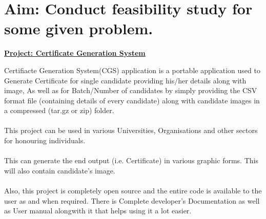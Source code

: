 \section*{\fontsize{16}{14}\selectfont Aim: Conduct feasibility study for some given problem.}
\begin{center}\underline{\textbf{Project: Certificate Generation System}}\end{center}
Certifiacte Generation System(CGS) application is a portable application used to Generate Certificate for single candidate providing his/her details along with image,
As well as for Batch/Number of candidates by simply providing the CSV format file (containing details of every candidate) along with candidate images in a compressed (tar.gz or zip) folder.\\\\
This project can be used in various Universities, Organisations and other sectors for honouring individuals.\\\\
This can generate the end output (i.e. Certificate) in various graphic forms. This will also contain candidate's image.\\\\ 
Also, this project is completely open source and the entire code is available 
to the user as and when required. There is Complete developer's 
Documentation as well as User manual alongwith it that helps using it a lot easier.

